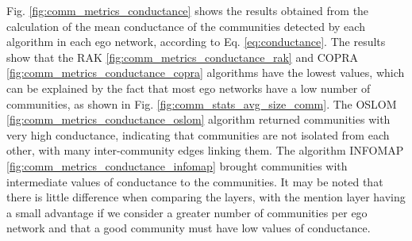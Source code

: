 Fig. \ref{fig:comm_metrics_conductance} shows the results obtained from the calculation of the mean conductance of the communities detected by each algorithm in each ego network, according to Eq. \ref{eq:conductance}. The results show that the RAK \ref{fig:comm_metrics_conductance_rak} and COPRA \ref{fig:comm_metrics_conductance_copra} algorithms have the lowest values, which can be explained by the fact that most ego networks have a low number of communities, as shown in Fig. \ref{fig:comm_stats_avg_size_comm}. The OSLOM \ref{fig:comm_metrics_conductance_oslom} algorithm returned communities with very high conductance, indicating that communities are not isolated from each other, with many inter-community edges linking them. The algorithm INFOMAP \ref{fig:comm_metrics_conductance_infomap} brought communities with intermediate values of conductance to the communities. It may be noted that there is little difference when comparing the layers, with the mention layer having a small advantage if we consider a greater number of communities per ego network and that a good community must have low values of conductance.

